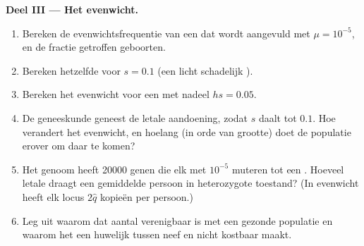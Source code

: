 \begin{problem}
\medskip
\noindent\textbf{Deel III --- Het evenwicht.}
\begin{enumerate}[resume]
  \item Bereken de evenwichtsfrequentie van een   dat
        wordt aangevuld met $\mu = 10^{-5}$, en de fractie getroffen geboorten.
  \item Bereken hetzelfde voor $s = 0.1$ (een licht schadelijk
         ).
  \item Bereken het evenwicht voor een   met
         nadeel $hs = 0.05$.
  \item De geneeskunde geneest de letale aandoening, zodat $s$ daalt tot $0.1$. Hoe
        verandert het evenwicht, en hoelang (in orde van grootte) doet de
        populatie erover om daar te komen?
  \item Het genoom heeft \num{20000} genen die elk met $10^{-5}$ muteren tot
        een  . Hoeveel letale  draagt een
        gemiddelde persoon in heterozygote toestand? (In
        evenwicht heeft elk locus $2\hat q$ kopieën per persoon.)
  \item Leg uit waarom dat aantal verenigbaar is met een gezonde
        populatie en waarom het een huwelijk tussen neef en nicht kostbaar maakt.
\end{enumerate}


\end{problem}
